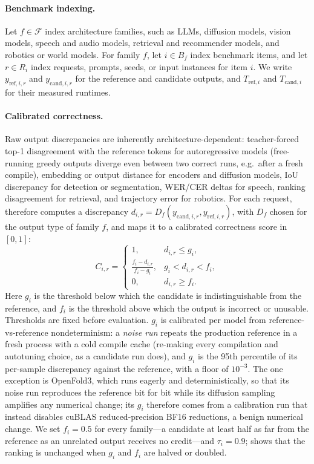\paragraph{Benchmark indexing.}
Let $f \in \mathcal{F}$ index architecture families, such as LLMs, diffusion models, vision models, speech and audio models, retrieval and recommender models, and robotics or world models.
For family $f$, let $i \in B_f$ index benchmark items, and let $r \in R_i$ index requests, prompts, seeds, or input instances for item $i$.
We write $y_{\mathrm{ref},i,r}$ and $y_{\mathrm{cand},i,r}$ for the reference and candidate outputs, and $T_{\mathrm{ref},i}$ and $T_{\mathrm{cand},i}$ for their measured runtimes.

\paragraph{Calibrated correctness.}
Raw output discrepancies are inherently architecture-dependent: teacher-forced top-1 disagreement with the reference tokens for autoregressive models (free-running greedy outputs diverge even between two correct runs, e.g.\ after a fresh compile), embedding or output distance for encoders and diffusion models, IoU discrepancy for detection or segmentation, WER/CER deltas for speech, ranking disagreement for retrieval, and trajectory error for robotics.
For each request, \FastKernels therefore computes a discrepancy $d_{i,r} = D_f(y_{\mathrm{cand},i,r}, y_{\mathrm{ref},i,r})$, with $D_f$ chosen for the output type of family $f$, and maps it to a calibrated correctness score in $[0,1]$:
\begin{equation}
C_{i,r} =
\begin{cases}
1, & d_{i,r} \le g_i, \\
\frac{f_i - d_{i,r}}{f_i - g_i}, & g_i < d_{i,r} < f_i, \\
0, & d_{i,r} \ge f_i.
\end{cases}
\end{equation}
Here $g_i$ is the threshold below which the candidate is indistinguishable from the reference, and $f_i$ is the threshold above which the output is incorrect or unusable.
Thresholds are fixed before evaluation. $g_i$ is calibrated per model from reference-vs-reference nondeterminism: a \emph{noise run} repeats the production reference in a fresh process with a cold compile cache (re-making every compilation and autotuning choice, as a candidate run does), and $g_i$ is the 95th percentile of its per-sample discrepancy against the reference, with a floor of $10^{-3}$.
The one exception is OpenFold3, which runs eagerly and deterministically, so that its noise run reproduces the reference bit for bit while its diffusion sampling amplifies any numerical change; its $g_i$ therefore comes from a calibration run that instead disables cuBLAS reduced-precision BF16 reductions, a benign numerical change.
We set $f_i = 0.5$ for every family---a candidate at least half as far from the reference as an unrelated output receives no credit---and $\tau_i = 0.9$;  shows that the ranking is unchanged when $g_i$ and $f_i$ are halved or doubled.

